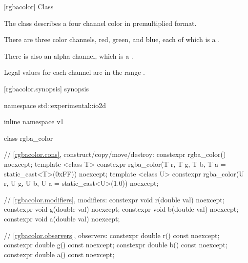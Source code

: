  [rgbacolor] {Class }

\pnum
{}
The class  describes a four channel color in premultiplied format.

\pnum
There are three color channels, red, green, and blue, each of which is a .

\pnum
There is also an alpha channel, which is a .

\pnum
Legal values for each channel are in the range .

%
 [rgbacolor.synopsis] { synopsis}

\begin{codeblock}
namespace std::experimental::io2d { inline namespace v1 {
  class rgba_color {
    // \ref{rgbacolor.cons}, construct/copy/move/destroy:
    constexpr rgba_color() noexcept;
    template <class T>
    constexpr rgba_color(T r, T g, T b, T a = static_cast<T>(0xFF)) noexcept;
    template <class U>
    constexpr rgba_color(U r, U g, U b, U a = static_cast<U>(1.0)) noexcept;
  
    // \ref{rgbacolor.modifiers}, modifiers:
    constexpr void r(double val) noexcept;
    constexpr void g(double val) noexcept;
    constexpr void b(double val) noexcept;
    constexpr void a(double val) noexcept;
    
    // \ref{rgbacolor.observers}, observers:
    constexpr double r() const noexcept;
    constexpr double g() const noexcept;
    constexpr double b() const noexcept;
    constexpr double a() const noexcept;
    
}}}
\end{codeblock}

